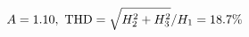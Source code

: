 \documentclass[preview]{standalone}
\begin{document}
\begin{align*}
\special{dvisvgm:raw <g id='unique000'>}A=1.10,\ \text{THD}=\sqrt{H_2^2+H_3^2}/H_1=18.7\%\special{dvisvgm:raw </g>}
\end{align*}
\end{document}
